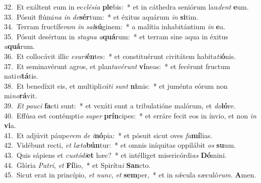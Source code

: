 {32.~}Et exáltent eum in ec\textit{clé}\textit{si}\textit{a} \textbf{ple}bis:~* et in cáthedra seniórum lau\textit{dent} \textbf{e}um.\\
{33.~}Pósuit flúmi\textit{na} \textit{in} \textit{de}\textbf{sér}tum:~* et éxitus aquárum \textit{in} \textbf{si}tim.\\
{34.~}Terram fructífe\textit{ram} \textit{in} \textit{sal}\textbf{sú}ginem:~* a malítia inhabitántium \textit{in} \textbf{e}a.\\
{35.~}Pósuit desértum in \textit{sta}\textit{gna} \textit{a}\textbf{quá}rum:~* et terram sine aqua in éxitus \textit{a}\textbf{quá}rum.\\
{36.~}Et collocávit illic \textit{e}\textit{su}\textit{ri}\textbf{én}tes:~* et constituérunt civitátem habita\textit{ti}\textbf{ó}nis.\\
{37.~}Et seminavérunt agros, et plan\textit{ta}\textit{vé}\textit{runt} \textbf{ví}neas:~* et fecérunt fructum nati\textit{vi}\textbf{tá}tis.\\
{38.~}Et benedíxit eis, et multipli\textit{cá}\textit{ti} \textit{sunt} \textbf{ni}mis:~* et juménta eórum non mi\textit{no}\textbf{rá}vit.\\
{39.~}\textit{Et} \textit{pau}\textit{ci} \textbf{fa}cti sunt:~* et vexáti sunt a tribulatióne malórum, et \textit{do}\textbf{ló}re.\\
{40.~}Effúsa est contémpti\textit{o} \textit{su}\textit{per} \textbf{prín}cipes:~* et erráre fecit eos in ínvio, et non \textit{in} \textbf{vi}a.\\
{41.~}Et adjúvit páupe\textit{rem} \textit{de} \textit{i}\textbf{nó}pia:~* et pósuit sicut oves \textit{fa}\textbf{mí}lias.\\
{42.~}Vidébunt recti, \textit{et} \textit{læ}\textit{ta}\textbf{bún}tur:~* et omnis iníquitas oppilábit \textit{os} \textbf{su}um.\\
{43.~}Quis sápiens et \textit{cu}\textit{stó}\textit{di}\textbf{et} hæc?~* et intélliget misericórdi\textit{as} \textbf{Dó}mini.\\
{44.~}Glória \textit{Pa}\textit{tri}, \textit{et} \textbf{Fí}lio,~* et Spirítu\textit{i} \textbf{San}cto.\\
{45.~}Sicut erat in princípio, \textit{et} \textit{nunc}, \textit{et} \textbf{sem}per,~* et in sǽcula sæculó\textit{rum}. \textbf{A}men.\\
